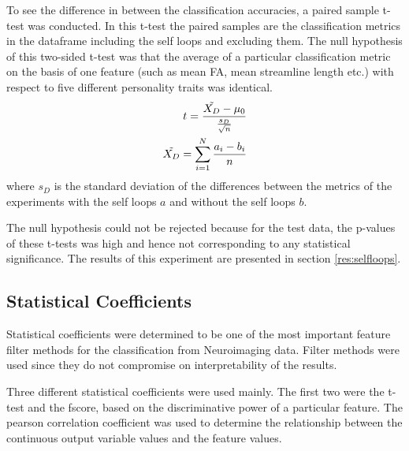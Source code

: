 \documentclass[msthesis.tex]{subfiles}
\begin{document}
To see the difference in between the classification accuracies, a paired sample t-test was conducted. In this t-test the paired samples are the classification metrics in the dataframe including the self loops and excluding them. The null hypothesis of this two-sided t-test was that the average of a particular classification metric on the basis of one feature (such as mean FA, mean streamline length etc.) with respect to five different personality traits was identical.
\begin{align}
    \label{eq:pairedtest}
    t = \frac{\Tilde{X_{D}} - \mu_0}{\frac{s_{D}}{\sqrt{n}}} \\
    \Tilde{X_D} = \sum_{i=1}^{N} \frac{a_{i} - b_{i}}{n}
\end{align}
where $s_D$ is the standard deviation of the differences between the metrics of the experiments with the self loops $a$ and without the self loops $b$. 

The null hypothesis could not be rejected because for the test data, the p-values of these t-tests was high and hence not corresponding to any statistical significance. The results of this experiment are presented in section \ref{res:selfloops}. 

\subsection{Statistical Coefficients}
\label{subsub:statcoef}

Statistical coefficients were determined to be one of the most important feature filter methods for the classification from Neuroimaging data. Filter methods were used since they do not compromise on interpretability of the results.

Three different statistical coefficients were used mainly. The first two were the t-test and the fscore, based on the discriminative power of a particular feature. The pearson correlation coefficient was used to determine the relationship between the continuous output variable values and the feature values. 
\end{document}
